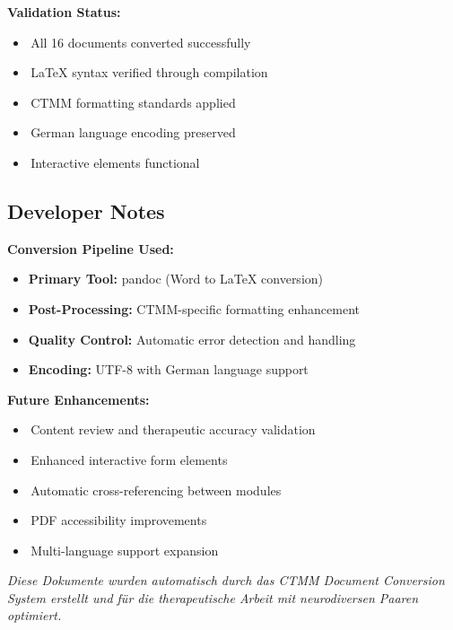 \textbf{Validation Status:}
\begin{itemize}
    \item \checkbox\,All 16 documents converted successfully
    \item \checkbox\,LaTeX syntax verified through compilation
    \item \checkbox\,CTMM formatting standards applied
    \item \checkbox\,German language encoding preserved
    \item \checkbox\,Interactive elements functional
\end{itemize}

\subsection{Developer Notes}

\textbf{Conversion Pipeline Used:}
\begin{itemize}
    \item \textbf{Primary Tool:} pandoc (Word to LaTeX conversion)
    \item \textbf{Post-Processing:} CTMM-specific formatting enhancement
    \item \textbf{Quality Control:} Automatic error detection and handling
    \item \textbf{Encoding:} UTF-8 with German language support
\end{itemize}

\textbf{Future Enhancements:}
\begin{itemize}
    \item \checkbox\,Content review and therapeutic accuracy validation
    \item \checkbox\,Enhanced interactive form elements
    \item \checkbox\,Automatic cross-referencing between modules
    \item \checkbox\,PDF accessibility improvements
    \item \checkbox\,Multi-language support expansion
\end{itemize}

\vspace{1cm}
\begin{center}
\textcolor{ctmmBlue}{\textit{Diese Dokumente wurden automatisch durch das CTMM Document Conversion System erstellt und für die therapeutische Arbeit mit neurodiversen Paaren optimiert.}}
\end{center}